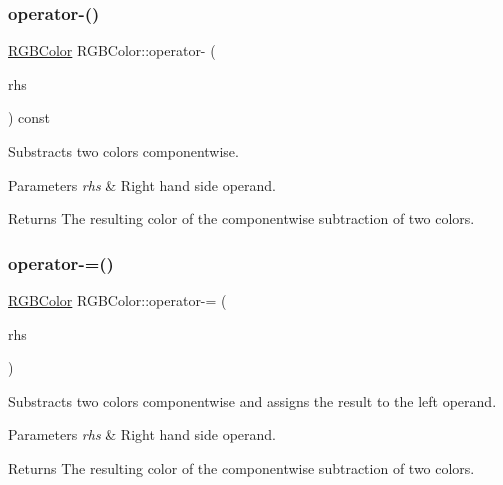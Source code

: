 \subsubsection{\texorpdfstring{operator-\/()}{operator-()}}
{\footnotesize\ttfamily \hyperlink{class_r_g_b_color}{R\+G\+B\+Color} R\+G\+B\+Color\+::operator-\/ (\begin{DoxyParamCaption}\item[{const \hyperlink{class_r_g_b_color}{R\+G\+B\+Color} \&}]{rhs }\end{DoxyParamCaption}) const\hspace{0.3cm}{\ttfamily [inline]}}

Substracts two colors componentwise. 
\begin{DoxyParams}{Parameters}
{\em rhs} & Right hand side operand. \\
\hline
\end{DoxyParams}
\begin{DoxyReturn}{Returns}
The resulting color of the componentwise subtraction of two colors. 
\end{DoxyReturn}
\hypertarget{group___utilities_ga1a36960da5c88b5e3e825ad01845de29}{}\label{group___utilities_ga1a36960da5c88b5e3e825ad01845de29} 
\subsubsection{\texorpdfstring{operator-\/=()}{operator-=()}}
{\footnotesize\ttfamily \hyperlink{class_r_g_b_color}{R\+G\+B\+Color} R\+G\+B\+Color\+::operator-\/= (\begin{DoxyParamCaption}\item[{const \hyperlink{class_r_g_b_color}{R\+G\+B\+Color} \&}]{rhs }\end{DoxyParamCaption})\hspace{0.3cm}{\ttfamily [inline]}}

Substracts two colors componentwise and assigns the result to the left operand. 
\begin{DoxyParams}{Parameters}
{\em rhs} & Right hand side operand. \\
\hline
\end{DoxyParams}
\begin{DoxyReturn}{Returns}
The resulting color of the componentwise subtraction of two colors. 
\end{DoxyReturn}
\hypertarget{group___utilities_ga932f5821d1c40799b6b40f2fe88b7070}{}\label{group___utilities_ga932f5821d1c40799b6b40f2fe88b7070} 
